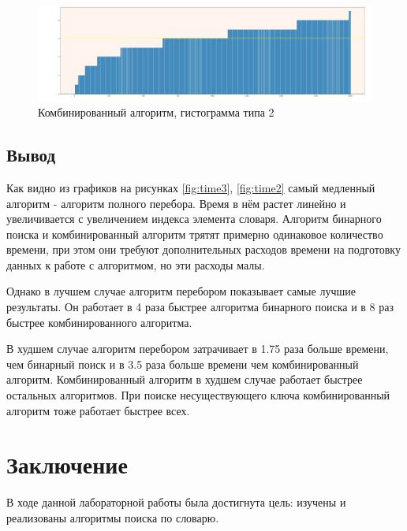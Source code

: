 \documentclass[12pt]{report}
\begin{document}
\begin{figure}[h]
	\begin{center}
		\includegraphics[scale=1]{gist6.jpg}
		\caption{Комбинированный алгоритм, гистограмма типа 2}
		\label{fig:full}
	\end{center}
\end{figure}

\clearpage
\newpage

\section{Вывод}

Как видно из графиков на рисунках \ref{fig:time3}, \ref{fig:time2} самый медленный алгоритм - алгоритм полного перебора. Время в нём растет линейно и увеличивается с увеличением индекса элемента словаря. Алгоритм бинарного поиска и комбинированный алгоритм трятят примерно одинаковое количество времени, при этом они требуют дополнительных расходов времени на подготовку данных к работе с алгоритмом, но эти расходы малы.

Однако в лучшем случае алгоритм перебором показывает самые лучшие результаты. Он работает в 4 раза быстрее алгоритма бинарного поиска и в 8 раз быстрее комбинированного алгоритма.

В худшем случае алгоритм перебором затрачивает в 1.75 раза больше времени, чем бинарный поиск и в 3.5 раза больше времени чем комбинированный алгоритм. Комбинированный алгоритм в худшем случае работает быстрее остальных алгоритмов. При поиске несуществующего ключа комбинированный алгоритм тоже работает быстрее всех.


\chapter*{Заключение}

В ходе данной лабораторной работы была достигнута цель: изучены и реализованы алгоритмы поиска по словарю.
\end{document}
